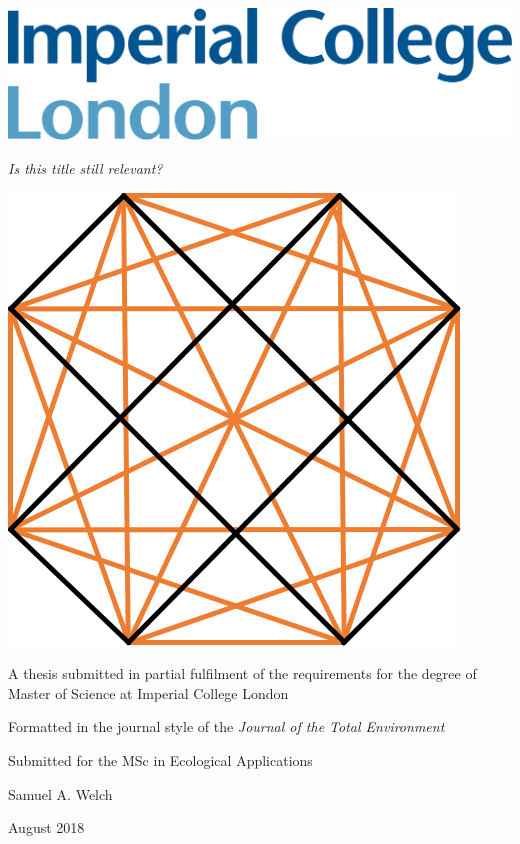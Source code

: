 \documentclass[final,1p,times]{elsarticle}
\begin{document}
\begin{titlepage}
\includegraphics[scale = 0.1]{icl_logo.png}\hfill

\addvspace{2cm}

\centering
{\huge \textit{Is this title still relevant?}}

\addvspace{4.5cm}

\includegraphics[scale = 0.5]{docs/badnews8ways.png}\hfill

\addvspace{4.5cm}

A thesis submitted in partial fulfilment of the requirements for the degree of Master of Science at Imperial College London

Formatted in the journal style of the \textit{Journal of the Total Environment}

Submitted for the MSc in Ecological Applications

Samuel A. Welch

August 2018
\end{titlepage}
\end{document}
